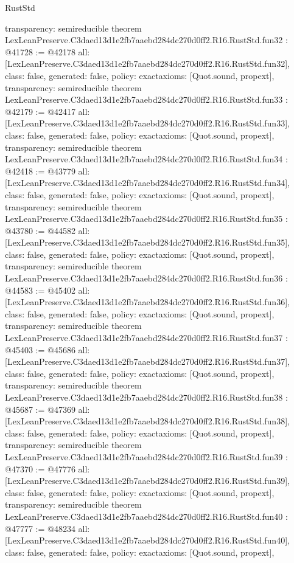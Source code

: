 \begin{lexlean}{RustStd}
\begin{coremodule}
{  transparency: semireducible
}
theorem LexLeanPreserve.C3daed13d1e2fb7aaebd284dc270d0ff2.R16.RustStd.fun32 : @41728 := @42178 {
  all: [LexLeanPreserve.C3daed13d1e2fb7aaebd284dc270d0ff2.R16.RustStd.fun32],
  class: false,
  generated: false,
  policy: exact{axioms: [Quot.sound, propext]},
  transparency: semireducible
}
theorem LexLeanPreserve.C3daed13d1e2fb7aaebd284dc270d0ff2.R16.RustStd.fun33 : @42179 := @42417 {
  all: [LexLeanPreserve.C3daed13d1e2fb7aaebd284dc270d0ff2.R16.RustStd.fun33],
  class: false,
  generated: false,
  policy: exact{axioms: [Quot.sound, propext]},
  transparency: semireducible
}
theorem LexLeanPreserve.C3daed13d1e2fb7aaebd284dc270d0ff2.R16.RustStd.fun34 : @42418 := @43779 {
  all: [LexLeanPreserve.C3daed13d1e2fb7aaebd284dc270d0ff2.R16.RustStd.fun34],
  class: false,
  generated: false,
  policy: exact{axioms: [Quot.sound, propext]},
  transparency: semireducible
}
theorem LexLeanPreserve.C3daed13d1e2fb7aaebd284dc270d0ff2.R16.RustStd.fun35 : @43780 := @44582 {
  all: [LexLeanPreserve.C3daed13d1e2fb7aaebd284dc270d0ff2.R16.RustStd.fun35],
  class: false,
  generated: false,
  policy: exact{axioms: [Quot.sound, propext]},
  transparency: semireducible
}
theorem LexLeanPreserve.C3daed13d1e2fb7aaebd284dc270d0ff2.R16.RustStd.fun36 : @44583 := @45402 {
  all: [LexLeanPreserve.C3daed13d1e2fb7aaebd284dc270d0ff2.R16.RustStd.fun36],
  class: false,
  generated: false,
  policy: exact{axioms: [Quot.sound, propext]},
  transparency: semireducible
}
theorem LexLeanPreserve.C3daed13d1e2fb7aaebd284dc270d0ff2.R16.RustStd.fun37 : @45403 := @45686 {
  all: [LexLeanPreserve.C3daed13d1e2fb7aaebd284dc270d0ff2.R16.RustStd.fun37],
  class: false,
  generated: false,
  policy: exact{axioms: [Quot.sound, propext]},
  transparency: semireducible
}
theorem LexLeanPreserve.C3daed13d1e2fb7aaebd284dc270d0ff2.R16.RustStd.fun38 : @45687 := @47369 {
  all: [LexLeanPreserve.C3daed13d1e2fb7aaebd284dc270d0ff2.R16.RustStd.fun38],
  class: false,
  generated: false,
  policy: exact{axioms: [Quot.sound, propext]},
  transparency: semireducible
}
theorem LexLeanPreserve.C3daed13d1e2fb7aaebd284dc270d0ff2.R16.RustStd.fun39 : @47370 := @47776 {
  all: [LexLeanPreserve.C3daed13d1e2fb7aaebd284dc270d0ff2.R16.RustStd.fun39],
  class: false,
  generated: false,
  policy: exact{axioms: [Quot.sound, propext]},
  transparency: semireducible
}
theorem LexLeanPreserve.C3daed13d1e2fb7aaebd284dc270d0ff2.R16.RustStd.fun40 : @47777 := @48234 {
  all: [LexLeanPreserve.C3daed13d1e2fb7aaebd284dc270d0ff2.R16.RustStd.fun40],
  class: false,
  generated: false,
  policy: exact{axioms: [Quot.sound, propext]},
}
\end{coremodule}
\end{lexlean}
